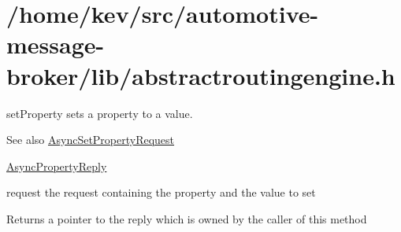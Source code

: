 \hypertarget{_2home_2kev_2src_2automotive-message-broker_2lib_2abstractroutingengine_8h-example}{\section{/home/kev/src/automotive-\/message-\/broker/lib/abstractroutingengine.\+h}
}
set\+Property sets a property to a value. \begin{DoxySeeAlso}{See also}
\hyperlink{classAsyncSetPropertyRequest}{Async\+Set\+Property\+Request} 

\hyperlink{classAsyncPropertyReply}{Async\+Property\+Reply} \begin{DoxyItemize}
\item request the request containing the property and the value to set \end{DoxyItemize}

\end{DoxySeeAlso}
\begin{DoxyReturn}{Returns}
a pointer to the reply which is owned by the caller of this method
\end{DoxyReturn}

\begin{DoxyCodeInclude}
\end{DoxyCodeInclude}
 
